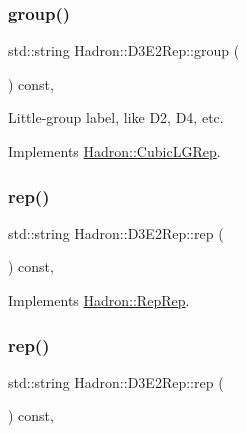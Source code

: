 \subsubsection{\texorpdfstring{group()}{group()}\hspace{0.1cm}{\footnotesize\ttfamily [3/3]}}
{\footnotesize\ttfamily std\+::string Hadron\+::\+D3\+E2\+Rep\+::group (\begin{DoxyParamCaption}{ }\end{DoxyParamCaption}) const\hspace{0.3cm}{\ttfamily [inline]}, {\ttfamily [virtual]}}

Little-\/group label, like D2, D4, etc. 

Implements \mbox{\hyperlink{structHadron_1_1CubicLGRep_a9bdb14b519a611d21379ed96a3a9eb41}{Hadron\+::\+Cubic\+L\+G\+Rep}}.

\mbox{\label{structHadron_1_1D3E2Rep_a364e5dfff2bff7d5c2cfce7811e2fe9f}} 
\subsubsection{\texorpdfstring{rep()}{rep()}\hspace{0.1cm}{\footnotesize\ttfamily [1/3]}}
{\footnotesize\ttfamily std\+::string Hadron\+::\+D3\+E2\+Rep\+::rep (\begin{DoxyParamCaption}{ }\end{DoxyParamCaption}) const\hspace{0.3cm}{\ttfamily [inline]}, {\ttfamily [virtual]}}



Implements \mbox{\hyperlink{structHadron_1_1RepRep_ab3213025f6de249f7095892109575fde}{Hadron\+::\+Rep\+Rep}}.

\mbox{\label{structHadron_1_1D3E2Rep_a364e5dfff2bff7d5c2cfce7811e2fe9f}} 
\subsubsection{\texorpdfstring{rep()}{rep()}\hspace{0.1cm}{\footnotesize\ttfamily [2/3]}}
{\footnotesize\ttfamily std\+::string Hadron\+::\+D3\+E2\+Rep\+::rep (\begin{DoxyParamCaption}{ }\end{DoxyParamCaption}) const\hspace{0.3cm}{\ttfamily [inline]}, {\ttfamily [virtual]}}



